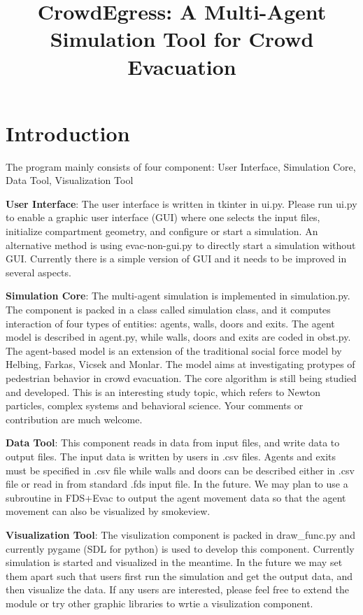 \documentclass{article}
\begin{document}
\title{CrowdEgress: A Multi-Agent Simulation Tool for Crowd Evacuation}

\maketitle

\section{Introduction} 

The program mainly consists of four component: User Interface, Simulation Core, Data Tool, Visualization Tool

\textbf{User Interface}: The user interface is written in tkinter in ui.py.  Please run ui.py to enable a graphic user interface (GUI) where one selects the input files, initialize compartment geometry, and configure or start a simulation.  An alternative method is using evac-non-gui.py to directly start a simulation without GUI.  Currently there is a simple version of GUI and it needs to be improved in several aspects.  

\textbf{Simulation Core}: The multi-agent simulation is implemented in simulation.py.  The component is packed in a class called simulation class, and it computes interaction of four types of entities: agents, walls, doors and exits.  The agent model is described in agent.py, while walls, doors and exits are coded in obst.py.  The agent-based model is an extension of the traditional social force model by Helbing, Farkas, Vicsek and Monlar.  The model aims at investigating protypes of pedestrian behavior in crowd evacuation.  The core algorithm is still being studied and developed.  This is an interesting study topic, which refers to Newton particles, complex systems and behavioral science.  Your comments or contribution are much welcome.  

\textbf{Data Tool}: This component reads in data from input files, and write data to output files.  The input data is written by users in .csv files.  Agents and exits must be specified in .csv file while walls and doors can be described either in .csv file or read in from standard .fds input file.  In the future.  We may plan to use a subroutine in FDS+Evac to output the agent movement data so that the agent movement can also be visualized by smokeview. 

\textbf{Visualization Tool}: The visulization component is packed in draw\_func.py and currently pygame (SDL for python) is used to develop this component.  Currently simulation is started and visualized in the meantime.  In the future we may set them apart such that users first run the simulation and get the output data, and then visualize the data.  If any users are interested, please feel free to extend the module or try other graphic libraries to wrtie a visulization component.
\end{document}

